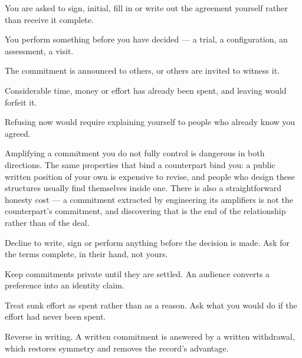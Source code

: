 \begin{feedback}
  \item You are asked to sign, initial, fill in or write out the agreement yourself rather than receive it complete.
  \item You perform something before you have decided --- a trial, a configuration, an assessment, a visit.
  \item The commitment is announced to others, or others are invited to witness it.
  \item Considerable time, money or effort has already been spent, and leaving would forfeit it.
  \item Refusing now would require explaining yourself to people who already know you agreed.
\end{feedback}

\begin{failure}
Amplifying a commitment you do not fully control is dangerous in both directions. The same properties that bind a counterpart bind you: a public written position of your own is expensive to revise, and people who design these structures usually find themselves inside one. There is also a straightforward honesty cost --- a commitment extracted by engineering its amplifiers is not the counterpart's commitment, and discovering that is the end of the relationship rather than of the deal.
\end{failure}

\begin{countermeasures}
  \item Decline to write, sign or perform anything before the decision is made. Ask for the terms complete, in their hand, not yours.
  \item Keep commitments private until they are settled. An audience converts a preference into an identity claim.
  \item Treat sunk effort as spent rather than as a reason. Ask what you would do if the effort had never been spent.
  \item Reverse in writing. A written commitment is answered by a written withdrawal, which restores symmetry and removes the record's advantage.
\end{countermeasures}

\seesources
{}
